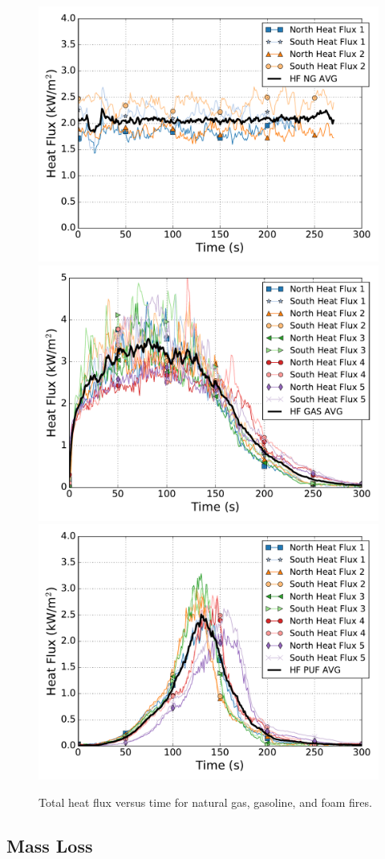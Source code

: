 \documentclass[twoside]{uocthesis}
\begin{document}
{\begin{figure}[p]
  \centering
  \includegraphics[width=.635\columnwidth]{../Figures/HF_NG}\\
  \includegraphics[width=.635\columnwidth]{../Figures/HF_GAS}\\
  \includegraphics[width=.635\columnwidth]{../Figures/HF_PUF}\\
  \caption[Total heat flux versus time for natural gas, gasoline, and foam fires]{Total heat flux versus time for natural gas, gasoline, and foam fires.}
  \label{Flux}
\end{figure}


\subsection{Mass Loss}

}
\end{document}
